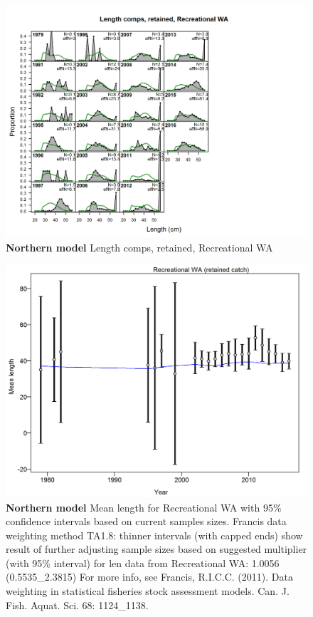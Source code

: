 \documentclass[12pt,]{article}
\begin{document}
\begin{figure}[htbp]
\centering
\includegraphics{./r4ss/plots_mod1/comp_lenfit_flt4mkt2.png}
\caption{\textbf{Northern model} Length comps, retained, Recreational WA
\label{fig:mod1_18_comp_lenfit_flt4mkt2}}
\end{figure}

\begin{figure}[htbp]
\centering
\includegraphics{./r4ss/plots_mod1/comp_lenfit_data_weighting_TA1.8_Recreational WA.png}
\caption{\textbf{Northern model} Mean length for Recreational WA with
95\% confidence intervals based on current samples sizes. Francis data
weighting method TA1.8: thinner intervals (with capped ends) show result
of further adjusting sample sizes based on suggested multiplier (with
95\% interval) for len data from Recreational WA: 1.0056
(0.5535\_2.3815) For more info, see Francis, R.I.C.C. (2011). Data
weighting in statistical fisheries stock assessment models. Can. J.
Fish. Aquat. Sci. 68: 1124\_1138.
\label{fig:mod1_21_comp_lenfit_data_weighting_TA1.8_Recreational WA}}
\end{figure}
\end{document}
